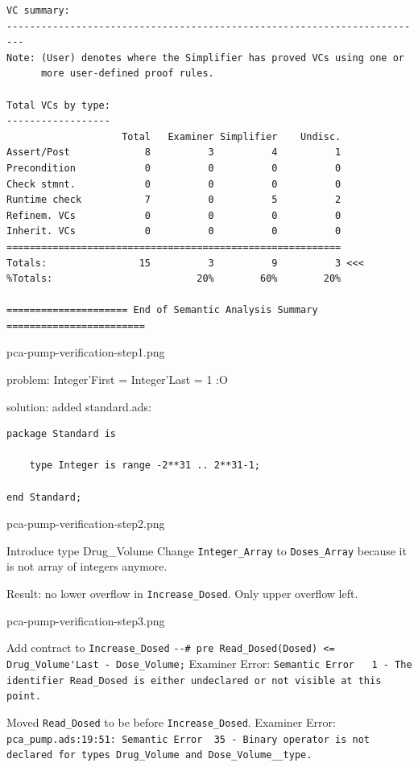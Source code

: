 \begin{lstlisting}[frame=single, gobble=0, caption={POGS report}]
VC summary:
-------------------------------------------------------------------------
Note: (User) denotes where the Simplifier has proved VCs using one or
      more user-defined proof rules.

Total VCs by type:
------------------
                    Total   Examiner Simplifier    Undisc.
Assert/Post             8          3          4          1
Precondition            0          0          0          0
Check stmnt.            0          0          0          0
Runtime check           7          0          5          2
Refinem. VCs            0          0          0          0
Inherit. VCs            0          0          0          0
==========================================================
Totals:                15          3          9          3 <<<
%Totals:                         20%        60%        20%

===================== End of Semantic Analysis Summary ========================
\end{lstlisting}
\label{listing:pcapump_dosemonitor_pogs}
\doublespacing

pca-pump-verification-step1.png

problem: Integer'First = Integer'Last = 1 :O

solution: added standard.ads:

\singlespacing
\begin{lstlisting}
package Standard is

    type Integer is range -2**31 .. 2**31-1;

end Standard;
\end{lstlisting}
\doublespacing

pca-pump-verification-step2.png

Introduce type Drug\_Volume
Change \lstinline{Integer_Array} to \lstinline{Doses_Array} because it is not array of integers anymore.

Result: no lower overflow in \lstinline{Increase_Dosed}. Only upper overflow left.

pca-pump-verification-step3.png

Add contract to \lstinline{Increase_Dosed} \lstinline{--# pre Read_Dosed(Dosed) <= Drug_Volume'Last - Dose_Volume;}
Examiner Error: \lstinline{Semantic Error   1 - The identifier Read_Dosed is either undeclared or not visible at this point.}


Moved \lstinline{Read_Dosed} to be before \lstinline{Increase_Dosed}.
Examiner Error: \lstinline{pca_pump.ads:19:51: Semantic Error  35 - Binary operator is not declared for types Drug_Volume and Dose_Volume__type.}

